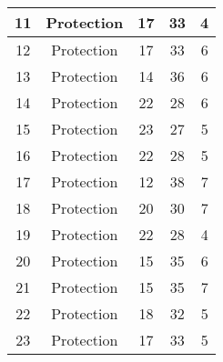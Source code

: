 \documentclass[results.tex]{subfiles}
\begin{document}
\begin{center}
\begin{tabular}{| c || c | c | c | c |}
            \hline
            11                      & Protection                   & 17                     & 33                      & 4                    \\
            \hline
            12                      & Protection                   & 17                     & 33                      & 6                    \\
            \hline
            13                      & Protection                   & 14                     & 36                      & 6                    \\
            \hline
            14                      & Protection                   & 22                     & 28                      & 6                    \\
            \hline
            15                      & Protection                   & 23                     & 27                      & 5                    \\
            \hline
            16                      & Protection                   & 22                     & 28                      & 5                    \\
            \hline
            17                      & Protection                   & 12                     & 38                      & 7                    \\
            \hline
            18                      & Protection                   & 20                     & 30                      & 7                    \\
            \hline
            19                      & Protection                   & 22                     & 28                      & 4                    \\
            \hline
            20                      & Protection                   & 15                     & 35                      & 6                    \\
            \hline
            21                      & Protection                   & 15                     & 35                      & 7                    \\
            \hline
            22                      & Protection                   & 18                     & 32                      & 5                    \\
            \hline
            23                      & Protection                   & 17                     & 33                      & 5                    \\

\end{tabular}
\end{center}
\end{document}
